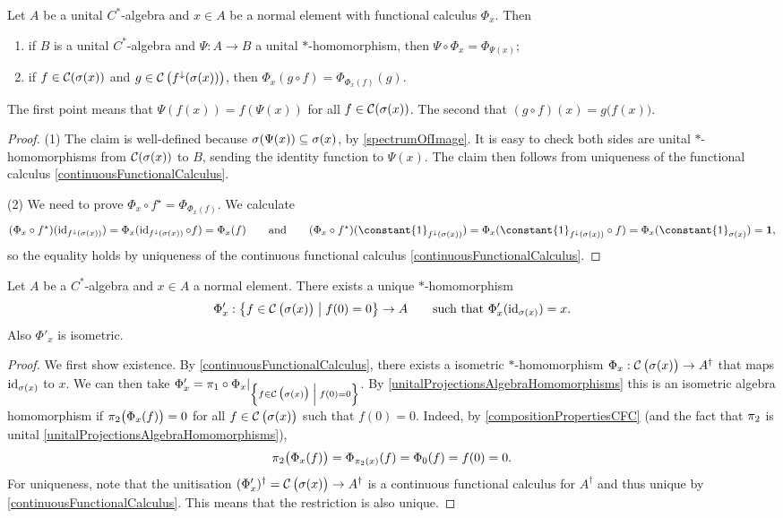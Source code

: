 \begin{proposition} \label{compositionPropertiesCFC}
Let $A$ be a unital $C^*$-algebra and $x\in A$ be a normal element with functional calculus $\Phi_x$. Then
\begin{enumerate}
\item if $B$ is a unital $C^*$-algebra and $\Psi: A\to B$ a unital $*$-homomorphism, then $\Psi\circ\Phi_x = \Phi_{\Psi(x)}$;
\item if $f\in\operatorname{\mathcal{C}}(\sigma(x))$ and $g\in\operatorname{\mathcal{C}}\big(f^{\downarrow}(\sigma(x))\big)$, then $\Phi_x(g\circ f) = \Phi_{\Phi_x(f)}(g)$.
\end{enumerate}
\end{proposition}
The first point means that $\Psi(f(x)) = f(\Psi(x))$ for all $f\in \operatorname{\mathcal{C}}(\sigma(x))$. The second that $(g\circ f)(x) = g\big(f(x)\big)$.
\begin{proof}
(1) The claim is well-defined because $\sigma(\Psi(x))\subseteq \sigma(x)$, by \ref{spectrumOfImage}. It is easy to check both sides are unital $*$-homomorphisms from $\operatorname{\mathcal{C}}(\sigma(x))$ to $B$, sending the identity function to $\Psi(x)$. The claim then follows from uniqueness of the functional calculus \ref{continuousFunctionalCalculus}.

(2) We need to prove $\Phi_x\circ f^\star = \Phi_{\Phi_x(f)}$. We calculate
\[ (\Phi_x\circ f^\star)(\id_{f^\imf(\spec(x))}) = \Phi_x(\id_{f^\imf(\spec(x))}\circ f) = \Phi_x(f) \qquad\text{and}\qquad (\Phi_x\circ f^\star)(\constant{1}_{f^\imf(\spec(x))}) = \Phi_x(\constant{1}_{f^\imf(\spec(x))}\circ f) = \Phi_x(\constant{1}_{\spec(x)}) = \vec{1}, \]
so the equality holds by uniqueness of the continuous functional calculus \ref{continuousFunctionalCalculus}.
\end{proof}


\begin{theorem} \label{nonUnitalContinuousFunctionalCalculus}
Let $A$ be a $C^*$-algebra and $x\in A$ a normal element. There exists a unique $*$-homomorphism
\[ \Phi'_x: \setbuilder{f\in \cont\big(\spec(x)\big)}{f(0) = 0} \to A \qquad \text{such that $\Phi'_x(\id_{\spec(x)}) = x$.} \]
Also $\Phi'_x$ is isometric.
\end{theorem}
\begin{proof}
We first show existence. By \ref{continuousFunctionalCalculus}, there exists a isometric $*$-homomorphism $\Phi_x: \operatorname{\mathcal{C}}\big(\sigma(x)\big)\to A^\dagger$ that maps $\operatorname{id}_{\sigma(x)}$ to $x$. We can then take $\Phi'_x = \proj_1\circ \Phi_x|_{\setbuilder{f\in \cont\big(\spec(x)\big)}{f(0) = 0}}$. By \ref{unitalProjectionsAlgebraHomomorphisms} this is an isometric algebra homomorphism if $\pi_2\big(\Phi_x(f)\big) = 0$ for all $f\in \operatorname{\mathcal{C}}\big(\sigma(x)\big)$ such that $f(0) = 0$. Indeed, by \ref{compositionPropertiesCFC} (and the fact that $\pi_2$ is unital \ref{unitalProjectionsAlgebraHomomorphisms}), 
\[ \pi_2\big(\Phi_x(f)\big) = \Phi_{\pi_2(x)}(f) = \Phi_{0}(f) = f(0) = 0. \]
For uniqueness, note that the unitisation $(\Phi'_x)^\dagger = \operatorname{\mathcal{C}}\big(\sigma(x)\big)\to A^\dagger$ is a continuous functional calculus for $A^\dagger$ and thus unique by \ref{continuousFunctionalCalculus}. This means that the restriction is also unique.
\end{proof}


